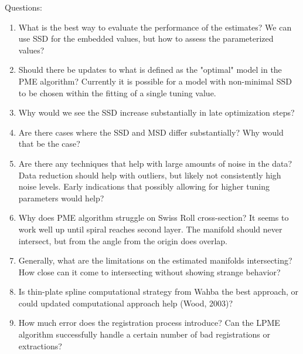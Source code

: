\documentclass[11pt,reqno]{article}
\begin{document}
Questions:
\begin{enumerate}
  \item What is the best way to evaluate the performance of the estimates? We can use SSD for the embedded values, but how to assess the parameterized values?
  \item Should there be updates to what is defined as the "optimal" model in the PME algorithm? Currently it is possible for a model with non-minimal SSD to be chosen within the fitting of a single tuning value.
  \item Why would we see the SSD increase substantially in late optimization steps?
  \item Are there cases where the SSD and MSD differ substantially? Why would that be the case?
  \item Are there any techniques that help with large amounts of noise in the data? Data reduction should help with outliers, but likely not consistently high noise levels. Early indications that possibly allowing for higher tuning parameters would help?
  \item Why does PME algorithm struggle on Swiss Roll cross-section? It seems to work well up until spiral reaches second layer. The manifold should never intersect, but from the angle from the origin does overlap.
  \item Generally, what are the limitations on the estimated manifolds intersecting? How close can it come to intersecting without showing strange behavior?
  \item Is thin-plate spline computational strategy from Wahba the best approach, or could updated computational approach help (Wood, 2003)?
  \item How much error does the registration process introduce? Can the LPME algorithm successfully handle a certain number of bad registrations or extractions?
\end{enumerate}

\nocite{*}


\end{document}
